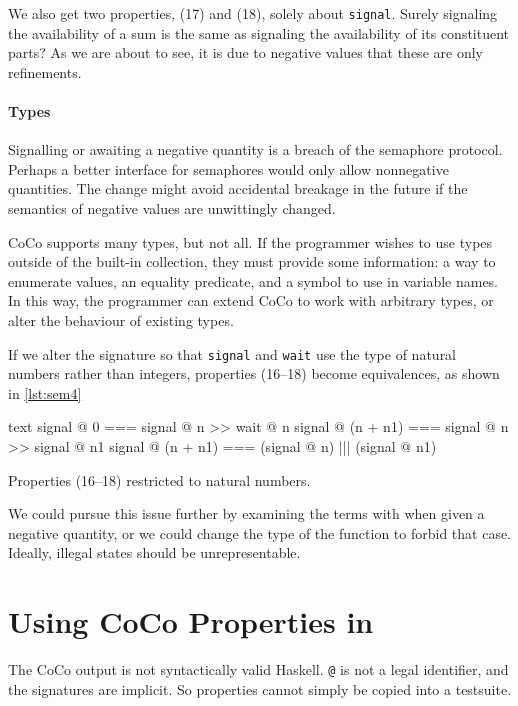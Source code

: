 We also get two properties, (17) and (18), solely about \verb|signal|.
Surely signaling the availability of a sum is the same as signaling
the availability of its constituent parts?  As we are about to see, it
is due to negative values that these are only refinements.

\paragraph{Types}
Signalling or awaiting a negative quantity is a breach of the
semaphore protocol.  Perhaps a better interface for semaphores would
only allow nonnegative quantities.  The change might avoid accidental
breakage in the future if the semantics of negative values are
unwittingly changed.

CoCo supports many types, but not all.  If the programmer wishes to
use types outside of the built-in collection, they must provide some
information: a way to enumerate values, an equality predicate, and a
symbol to use in variable names.  In this way, the programmer can
extend CoCo to work with arbitrary types, or alter the behaviour of
existing types.

If we alter the signature so that \verb|signal| and \verb|wait| use
the type of natural numbers rather than integers, properties (16--18)
become equivalences, as shown in \cref{lst:sem4}

\begin{listing}
\centering
\begin{cminted}{text}
       signal @ 0  ===  signal @ n >> wait @ n
signal @ (n + n1)  ===  signal @ n >> signal @ n1
signal @ (n + n1)  ===  (signal @ n) ||| (signal @ n1)
\end{cminted}
\caption{Properties (16--18) restricted to natural numbers.}\label{lst:sem4}
\end{listing}

We could pursue this issue further by examining the terms with
\dejafu{} when given a negative quantity, or we could change the type
of the function to forbid that case.  Ideally, illegal states should
be unrepresentable.

\section{Using CoCo Properties in \dejafu{}}
\label{sec:coco-dejafu}

The CoCo output is not syntactically valid Haskell.  \texttt{@} is not
a legal identifier, and the signatures are implicit.  So properties
cannot simply be copied into a testsuite.

